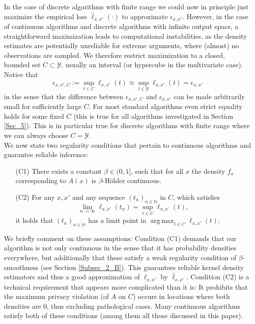 \documentclass[conference]{IEEEtran}
\DeclareMathOperator*{\argmax}{arg\,max}
\begin{document}
In the case of discrete algorithms with finite range we could now in principle just maximize the empirical loss $\hat{\ell}_{x,x'}(\cdot)$ to approximate $\epsilon_{x,x'}$. However, in the case of continuous algorithms and discrete algorithms with infinite output space, a straightforward maximization leads to computational instabilities, as the density estimates are potentially unreliable for extreme arguments, where (almost) no observations are sampled. We therefore restrict maximization to a closed, bounded set $C \subset \mathcal{Y}$, usually an interval (or hypercube in the multivariate case). Notice that 
\begin{equation} \label{Eq_truncated_level}
    \epsilon_{x,x',C} := \sup_{t \in C} \ell_{x,x'}(t)  \approx \sup_{t \in \mathcal{Y}} \ell_{x,x'}(t) = \epsilon_{x,x'}
\end{equation}
in the sense that the difference between $\epsilon_{x,x',C}$ and $\epsilon_{x,x'}$ can be made arbitrarily small for sufficiently large $C$.
For most standard algorithms even strict equality holds for some fixed $C$ (this is true for all algorithms investigated in Section \ref{Sec_5}). 
This is in particular true for discrete algorithms with finite range where we can always choose $C = \mathcal{Y}$. \\
We now state two regularity conditions that pertain to continuous algorithms and guarantee reliable inference: \\

\begin{itemize}
    \item[(C1)] There exists a constant  $\beta \in (0,1]$, such that for all $x$ the density $f_{x}$ corresponding to $A(x)$ is $\beta$-Hölder continuous.\\
    \item[(C2)] For any $x, x'$ and any sequence $(t_n)_{n \in \mathbb{N}}$ in $C$, which satisfies 
    $$
    \lim_{n \to \infty} \ell_{x,x'}(t_n) = \sup_{t \in C} \ell_{x,x'}(t),
    $$
    it holds that $(t_n)_{n \in \mathbb{N}}$ has a limit point in $\argmax_{t \in C }\ell_{x,x'}(t)$. \\
\end{itemize} 

We briefly comment on these assumptions:
Condition (C1) demands that our algorithm is not only continuous in the sense that it has probability densities everywhere, but additionally that these satisfy a weak regularity condition of $\beta$-smoothness (see Section \ref{Subsec_2_B}).  
This guarantees reliable kernel density estimators and thus a good approximation of $\ell_{x,x'}$ by $\hat \ell_{x,x'}$.
Condition (C2) is a technical requirement that appears more complicated than it is: It prohibits that the maximum privacy violation (of $A$ on $C$) occurs in locations where both densities are $0$, thus excluding pathological cases. Many continuous algorithms satisfy both of these conditions (among them all those discussed in this paper).
\end{document}
